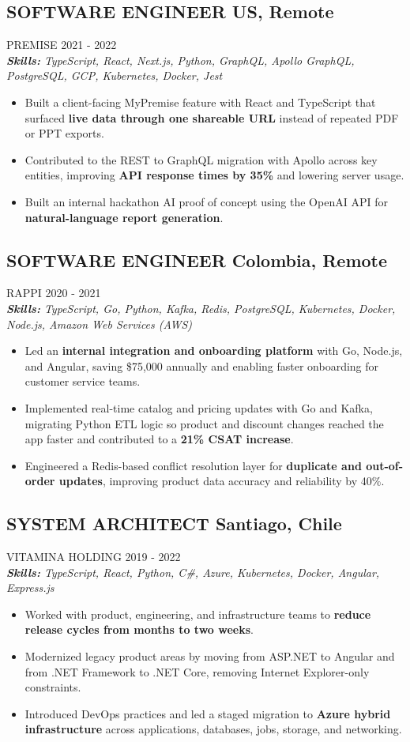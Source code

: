 \documentclass{article}
\newcommand{\WorkExperience}[2]{
   \subsection*{#1}
   \vspace{-1em}
   \uppercase{#2}
}
\newcommand{\Skills}[1]{
   \textit{\textbf{Skills:} #1}
}
\begin{document}
\WorkExperience{SOFTWARE ENGINEER \hfill US, Remote}{Premise \hfill 2021 {-} 2022} \\
\Skills{TypeScript, React, Next.js, Python, GraphQL, Apollo GraphQL, PostgreSQL, GCP, Kubernetes, Docker, Jest}
\begin{itemize}
	\item Built a client-facing MyPremise feature with React and TypeScript that surfaced \textbf{live data through one shareable URL} instead of repeated PDF or PPT exports.
	\item Contributed to the REST to GraphQL migration with Apollo across key entities, improving \textbf{API response times by 35\%} and lowering server usage.
	\item Built an internal hackathon AI proof of concept using the OpenAI API for \textbf{natural-language report generation}.
\end{itemize}

\WorkExperience{SOFTWARE ENGINEER \hfill Colombia, Remote}{Rappi \hfill 2020 {-} 2021} \\
\Skills{TypeScript, Go, Python, Kafka, Redis, PostgreSQL, Kubernetes, Docker, Node.js, Amazon Web Services (AWS)}
\begin{itemize}
	\item Led an \textbf{internal integration and onboarding platform} with Go, Node.js, and Angular, saving \$75,000 annually and enabling faster onboarding for customer service teams.
	\item Implemented real-time catalog and pricing updates with Go and Kafka, migrating Python ETL logic so product and discount changes reached the app faster and contributed to a \textbf{21\% CSAT increase}.
	\item Engineered a Redis-based conflict resolution layer for \textbf{duplicate and out-of-order updates}, improving product data accuracy and reliability by 40\%.
\end{itemize}

\WorkExperience{SYSTEM ARCHITECT \hfill Santiago, Chile}{Vitamina Holding \hfill 2019 {-} 2022} \\
\Skills{TypeScript, React, Python, C\#, Azure, Kubernetes, Docker, Angular, Express.js}
\begin{itemize}
	\item Worked with product, engineering, and infrastructure teams to \textbf{reduce release cycles from months to two weeks}.
	\item Modernized legacy product areas by moving from ASP.NET to Angular and from .NET Framework to .NET Core, removing Internet Explorer-only constraints.
	\item Introduced DevOps practices and led a staged migration to \textbf{Azure hybrid infrastructure} across applications, databases, jobs, storage, and networking.
\end{itemize}
\end{document}

